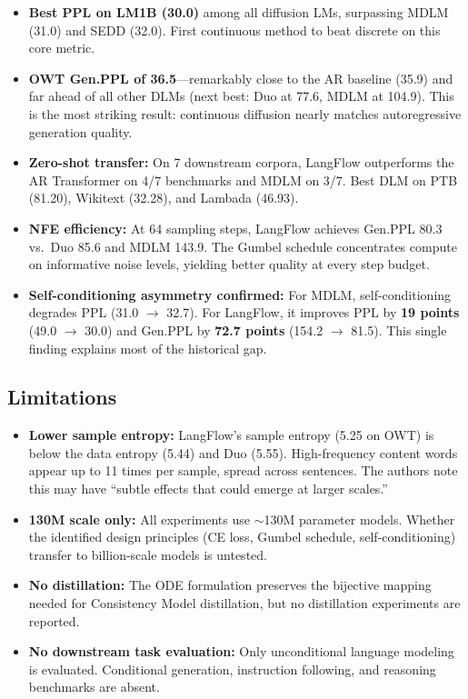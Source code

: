 \documentclass[11pt]{article}
\begin{document}
\begin{itemize}
    \item \textbf{Best PPL on LM1B (30.0)} among all diffusion LMs, surpassing MDLM (31.0) and SEDD (32.0). First continuous method to beat discrete on this core metric.

    \item \textbf{OWT Gen.PPL of 36.5}---remarkably close to the AR baseline (35.9) and far ahead of all other DLMs (next best: Duo at 77.6, MDLM at 104.9). This is the most striking result: continuous diffusion nearly matches autoregressive generation quality.

    \item \textbf{Zero-shot transfer:} On 7 downstream corpora, LangFlow outperforms the AR Transformer on 4/7 benchmarks and MDLM on 3/7. Best DLM on PTB (81.20), Wikitext (32.28), and Lambada (46.93).

    \item \textbf{NFE efficiency:} At 64 sampling steps, LangFlow achieves Gen.PPL 80.3 vs.\ Duo 85.6 and MDLM 143.9. The Gumbel schedule concentrates compute on informative noise levels, yielding better quality at every step budget.

    \item \textbf{Self-conditioning asymmetry confirmed:} For MDLM, self-conditioning degrades PPL (31.0 $\to$ 32.7). For LangFlow, it improves PPL by \textbf{19 points} (49.0 $\to$ 30.0) and Gen.PPL by \textbf{72.7 points} (154.2 $\to$ 81.5). This single finding explains most of the historical gap.
\end{itemize}

\subsection{Limitations}

\begin{itemize}
    \item \textbf{Lower sample entropy:} LangFlow's sample entropy (5.25 on OWT) is below the data entropy (5.44) and Duo (5.55). High-frequency content words appear up to 11 times per sample, spread across sentences. The authors note this may have ``subtle effects that could emerge at larger scales.''

    \item \textbf{130M scale only:} All experiments use $\sim$130M parameter models. Whether the identified design principles (CE loss, Gumbel schedule, self-conditioning) transfer to billion-scale models is untested.

    \item \textbf{No distillation:} The ODE formulation preserves the bijective mapping needed for Consistency Model distillation, but no distillation experiments are reported.

    \item \textbf{No downstream task evaluation:} Only unconditional language modeling is evaluated. Conditional generation, instruction following, and reasoning benchmarks are absent.
\end{itemize}
\end{document}
